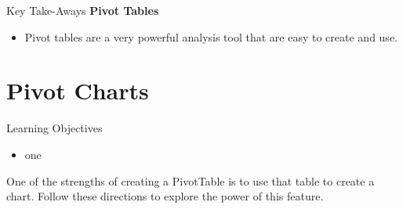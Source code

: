 \begin{center}
	\begin{tkwbox}{Key Take-Aways}
		\textbf{Pivot Tables}
		\\
		\begin{itemize}
			\setlength{\itemsep}{0pt}
			\setlength{\parskip}{0pt}
			\setlength{\parsep}{0pt}
			
			\item Pivot tables are a very powerful analysis tool that are easy to create and use.
			
		\end{itemize}
	\end{tkwbox}
\end{center}

\section{Pivot Charts}

\begin{center}
	\begin{objbox}{Learning Objectives}
		\begin{itemize}
			\setlength{\itemsep}{0pt}
			\setlength{\parskip}{0pt}
			\setlength{\parsep}{0pt}
			
			\item one
			
		\end{itemize}
	\end{objbox}
\end{center}

One of the strengths of creating a PivotTable is to use that table to create a chart. Follow these directions to explore the power of this feature.

